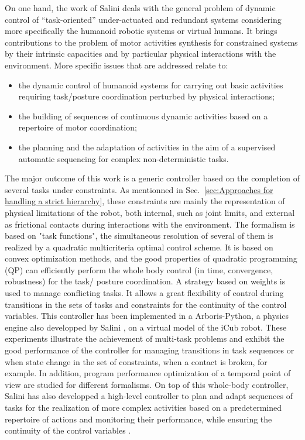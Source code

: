 \documentclass[12pt,a4paper,twoside]{article}
\begin{document}
On one hand, the work of Salini deals with the general problem of dynamic control of “task-oriented” under-actuated and redundant systems considering more specifically the humanoid robotic systems or virtual humans. It brings contributions to the problem of motor activities synthesis for constrained systems by their intrinsic capacities and by particular physical interactions with the environment. More specific issues that are addressed relate to:
\begin{itemize}
\item the dynamic control of humanoid systems for carrying out basic activities requiring task/posture coordination perturbed by physical interactions;
\item the building of sequences of continuous dynamic activities based on a repertoire of motor coordination;
\item the planning and the adaptation of activities in the aim of a supervised automatic sequencing for complex non-deterministic tasks.
\end{itemize}
The major outcome of this work is a generic controller based on the completion of several tasks under constraints. As mentionned in Sec.~\ref{sec:Approaches for handling a strict hierarchy}, these constraints are mainly the representation of physical limitations of the robot, both internal, such as joint limits, and external as frictional contacts during interactions with the environment. The formalism is based on "task functions", the simultaneous resolution of several of them is realized by a quadratic multicriteria optimal control scheme. It is based on convex optimization methods, and the good properties of quadratic programming (QP) can efficiently perform the whole body control (in time, convergence, robustness) for the task/ posture coordination. A strategy based on weights is used to manage conflicting tasks. It allows a great flexibility of control during transitions in the sets of tasks and constraints for the continuity of the control variables. This controller has been implemented in a Arboris-Python, a physics engine also developped by Salini \cite{Arboris-Python}, on a virtual model of the iCub robot. These experiments illustrate the achievement of multi-task problems and exhibit the good  performance of the controller for managing transitions in task sequences or when state change in the set of constraints, when a contact is broken, for example. In addition, program performance optimization of a temporal point of view are studied for different formalisms. On top of this whole-body controller, Salini has also developped a high-level controller to plan and adapt sequences of tasks for the realization of more complex activities based on a predetermined repertoire of actions and monitoring their performance, while ensuring the continuity of the  control variables .\\
\end{document}
